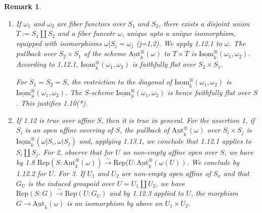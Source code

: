 \documentclass{article}
\newtheorem{remark}[term]{Remark}
\begin{document}
  \begin{remark}
    \begin{enumerate}
      \item If $\omega_1$ and $\omega_2$ are fiber functors over $S_1$ and $S_2$, there exists a disjoint union 
        $T := S_1 \coprod S_2$ and a fiber funcotr $\omega$, unique upto a unique isomorphism, equipped with 
        isomorphisms $\omega |S_j = \omega_j$ (j=1,2). We apply 1.12.1 to $\omega$. The pullback over 
        $S_2 \times S_1$ of the scheme $\underline{\text{Aut}} ^ \otimes _ k (\omega)$ to $T \times T$ is 
        $\underline{\text{Isom}}_k ^\otimes (\omega_1,\omega_2)$. According to 1.12.1, 
        $\underline{\text{Isom}}_k ^\otimes (\omega_1,\omega_2)$ is faithfully flat over $S_2 \times S_1$. 

        For $S_1 = S_2 = S$, the restriction to the diagonal of 
        $\underline{\text{Isom}}_k ^\otimes (\omega_1,\omega_2)$ is 
        $\underline{\text{Isom}}_S ^\otimes (\omega_1,\omega_2)$. The $S$-scheme 
        $\underline{\text{Isom}}_S ^\otimes (\omega_1,\omega_2)$ is hence faithfully flat over $S$. This justifies 
        1.10(*).
      \item If 1.12 is true over affine $S$, then it is true in general. For the assertion 1, if $S_i$ is an 
        open affine covering of $S$, the pullback of $\underline{\text{Aut}}^\otimes _k (\omega)$ over 
        $S_i \times S_j$ is $\underline{\text{Isom}}^\otimes _k (\omega |S_i, \omega|S_j)$ and, applying 
        1.13.1, we conclude that 1.12.1 applies to $S_i \coprod S_j$. For 2, observe that for $U$ an non-empty affine 
        open over $S$, we have by 1.8 
        $\text{Rep}(S:\underline{\text{Aut}}_k ^\otimes (\omega)) \xrightarrow \sim 
        \text{Rep}(U:\underline {\text{Aut}} ^ \otimes _k (\omega(U))$. We conclude by 1.12.2 for $U$.
        For 3. If $U_1$ and $U_2$ are non-empty open affine of $S_x$ and that $G_U$ is the induced groupoid over 
        $U = U_1 \coprod U_2$, we have $\text{Rep} (S:G) \xrightarrow \sim \text{Rep}(U:G_U)$ and by 1.12.3 applied
        to $U$, the morphism $G \rightarrow \underline{\text{Aut}}_k(\omega)$ is an isomorphism by above on 
        $U_1 \times U_2$.
    \end{enumerate}
  \end{remark}
\end{document}
